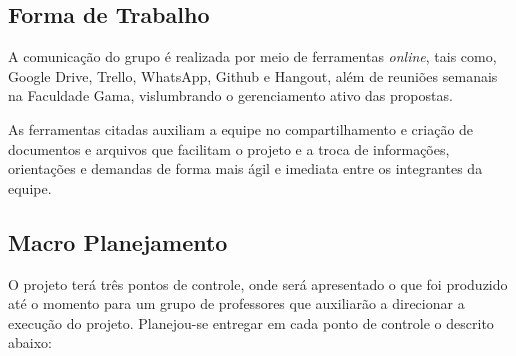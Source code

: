 \subsection{Forma de Trabalho}
A comunicação  do grupo é realizada por meio de ferramentas \textit{online}, tais como, \textsf{Google Drive}, \textsf{Trello}, \textsf{WhatsApp}, \textsf{Github} e \textsf{Hangout}, além de reuniões semanais na Faculdade Gama, vislumbrando o gerenciamento ativo das propostas.
\par
As ferramentas citadas auxiliam a equipe no compartilhamento e criação de documentos e arquivos que facilitam o projeto e a troca de informações, orientações e demandas de forma mais ágil e imediata entre os integrantes da equipe.

\subsection{Macro Planejamento}
O projeto terá três pontos de controle, onde será apresentado o que foi produzido
até o momento para um grupo de professores que auxiliarão a direcionar a execução
do projeto. Planejou-se entregar em cada ponto de controle o descrito abaixo:
\par
